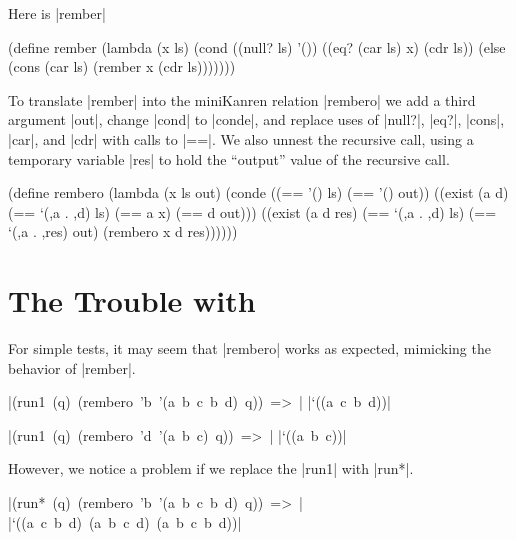 \newpage

Here is \mbox{\scheme|rember|}

\schemedisplayspace
\begin{schemedisplay}
(define rember
  (lambda (x ls)
    (cond
      ((null? ls) '())
      ((eq? (car ls) x) (cdr ls))
      (else (cons (car ls) (rember x (cdr ls)))))))
\end{schemedisplay}

To translate \mbox{\scheme|rember|} into the miniKanren relation
\mbox{\scheme|rembero|} we add a third argument \mbox{\scheme|out|},
change \mbox{\scheme|cond|} to \mbox{\scheme|conde|}, and replace uses
of \mbox{\scheme|null?|}, \mbox{\scheme|eq?|}, \mbox{\scheme|cons|},
\mbox{\scheme|car|}, and \mbox{\scheme|cdr|} with calls to
\mbox{\scheme|==|}.  We also unnest the recursive call, using a
temporary variable \mbox{\scheme|res|} to hold the ``output'' value of
the recursive call.

\schemedisplayspace
\begin{schemedisplay}
(define rembero
  (lambda (x ls out)
    (conde
      ((== '() ls) (== '() out))
      ((exist (a d)
         (== `(,a . ,d) ls)
         (== a x)
         (== d out)))
      ((exist (a d res)
         (== `(,a . ,d) ls)
         (== `(,a . ,res) out)
         (rembero x d res))))))
\end{schemedisplay}

\section{The Trouble with {\remberosymbol}}\label{remberotrouble}

For simple tests, it may seem that \mbox{\scheme|rembero|} works as
expected, mimicking the behavior of \mbox{\scheme|rember|}.

\wspace

\noindent\mbox{\scheme|(run1 (q) (rembero 'b '(a b c b d) q)) => |} \mbox{\schemeresult|`((a c b d))|}

\wspace

\noindent\mbox{\scheme|(run1 (q) (rembero 'd '(a b c) q)) => |} \mbox{\schemeresult|`((a b c))|}

\wspace

\noindent However, we notice a problem if we replace the \mbox{\scheme|run1|}
with \mbox{\scheme|run*|}.

\wspace

\noindent\mbox{\scheme|(run* (q) (rembero 'b '(a b c b d) q)) => |} \mbox{\schemeresult|`((a c b d) (a b c d) (a b c b d))|}

